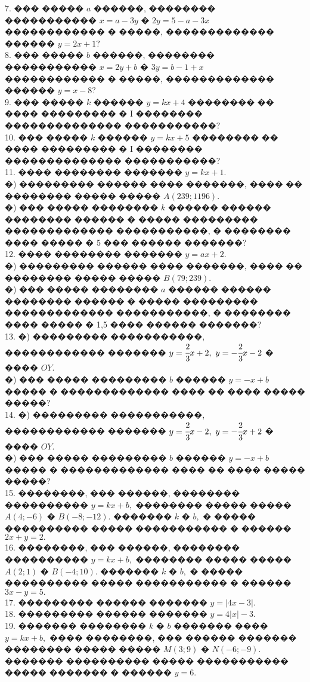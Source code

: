 \documentclass[12pt]{article}
\begin{document}
7. ��� ����� $a$ ������, �������� ����������� $x=a-3y$ � $2y=5-a-3x$ ������������ � �����, ������������� ������ $y=2x+1?$\\
8. ��� ����� $b$ ������, �������� ����������� $x=2y+b$ � $3y=b-1+x$ ������������ � �����, ������������� ������ $y=x-8?$\\
9. ��� ����� $k$ ������ $y=kx+4$ �������� �� ���� ��������� � I �������� �������������� �����������?\\
10. ��� ����� $k$ ������ $y=kx+5$ �������� �� ���� ��������� � I �������� �������������� �����������?\\
11. ���� �������� ������� $y=kx+1.$\\
�) ��������� ������ ���� �������, ���� �� �������� ����� ����� $A(239;1196).$\\
�) ��� ����� �������� $k$ ������ ������ �������� ������ � ����� ��������� ������������� �����������, � �������� ���� ����� � 5 ��� ������ �������?\\
12. ���� �������� ������� $y=ax+2.$\\
�) ��������� ������ ���� �������, ���� �� �������� ����� ����� $B(79;239).$\\
�) ��� ����� �������� $a$ ������ ������ �������� ������ � ����� ��������� ������������� �����������, � �������� ���� ����� � 1,5 ���� ������ �������?\\
13. �) ��������� �����������, ������������ ������� $y=\cfrac{2}{3}x+2,\ y=-\cfrac{2}{3}x-2$ � ���� $OY.$\\
�) ��� ����� ��������� $b$ ������ $y=-x+b$ ����� � ������������� ���� �� ���� ����� �����?\\
14. �) ��������� �����������, ������������ ������� $y=\cfrac{2}{3}x-2,\ y=-\cfrac{2}{3}x+2$ � ���� $OY.$\\
�) ��� ����� ��������� $b$ ������ $y=-x+b$ ����� � ������������� ���� �� ���� ����� �����?\\
15. ��������, ��� ������, �������� ���������� $y=kx+b,$ �������� ����� ����� $A(4;-6)$ � $B(-8;-12).$ ������� $k$ � $b,$ � ����� ���������� ����� ����������� � ������ $2x+y=2.$\\
16. ��������, ��� ������, �������� ���������� $y=kx+b,$ �������� ����� ����� $A(2;1)$ � $B(-4;10).$ ������� $k$ � $b,$ � ����� ���������� ����� ����������� � ������ $3x-y=5.$\\
17. ��������� ������ ������� $y=|4x-3|.$\\
18. ��������� ������ ������� $y=4|x|-3.$\\
19. ������� �������� $k$ � $b$ ������� ���� $y=kx+b,$ ���� ��������, ��� ������ ������� �������� ����� ����� $M(3;9)$ � $N(-6;-9).$ ������� ���������� ����� ����������� ����� ������� � ������ $y=6.$\\
\end{document}
